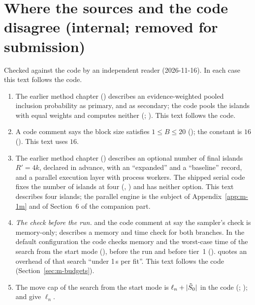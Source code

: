 \documentclass[11pt]{article}
\begin{document}
\section{Where the sources and the code disagree (internal; removed for submission)}\label{app:m-disagree}
Checked against the code by an independent reader (2026-11-16). In each case this text follows the code.
\begin{enumerate}[leftmargin=1.8em]
  \item The earlier method chapter () describes an
    evidence-weighted pooled inclusion probability as primary, and  as
    secondary; the code pools the islands with equal weights and computes neither (;
    ). This text follows the code.
  \item A code comment says the block size satisfies $1\le B\le20$ (); the constant is $16$
    (). This text uses $16$.
  \item The earlier method chapter () describes an optional
    number of final islands $R'=4k$, declared in advance, with an ``expanded'' and a ``baseline'' record, and a parallel
    execution layer with process workers. The shipped serial code fixes the number of islands at four
    (, ) and has neither option. This text describes four islands; the parallel
    engine is the subject of Appendix~\ref{app:m-1m} and of Section~6 of the companion part.
  \item \emph{The check before the run.}  and the code comment at  say the
    sampler's check is memory-only;  describes a memory and time check for both
    branches. In the default configuration the code checks memory and the worst-case time of the search from the start
    mode (), before the run and before tier~1 (). 
    quotes an overhead of that search ``under 1\,s per fit''. This text follows the code (Section~\ref{sec:m-budgets}).
  \item The move cap of the search from the start mode is $\ell_n+\lvert \tilde S_0\rvert$ in the code (;
    );  and  give $\ell_n$.

\end{enumerate}
\end{document}
